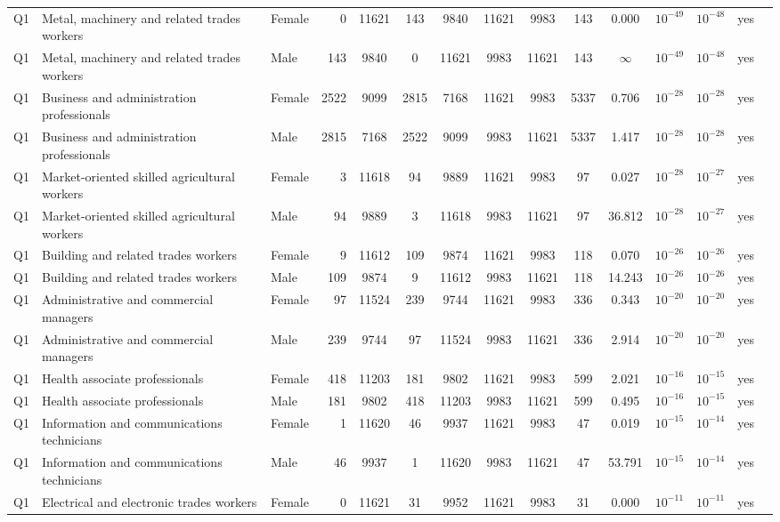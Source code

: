 \begin{longtable}{lllrcccccccccll}
Q1 & Metal, machinery and related trades workers & Female & 0 & 11621 & 143 & 9840 & 11621 & 9983 & 143 & 0.000 & $10^{-49}$ & $10^{-48}$ & yes \\
Q1 & Metal, machinery and related trades workers & Male & 143 & 9840 & 0 & 11621 & 9983 & 11621 & 143 & $\infty$ & $10^{-49}$ & $10^{-48}$ & yes \\
Q1 & Business and administration professionals & Female & 2522 & 9099 & 2815 & 7168 & 11621 & 9983 & 5337 & 0.706 & $10^{-28}$ & $10^{-28}$ & yes \\
Q1 & Business and administration professionals & Male & 2815 & 7168 & 2522 & 9099 & 9983 & 11621 & 5337 & 1.417 & $10^{-28}$ & $10^{-28}$ & yes \\
Q1 & Market-oriented skilled agricultural workers & Female & 3 & 11618 & 94 & 9889 & 11621 & 9983 & 97 & 0.027 & $10^{-28}$ & $10^{-27}$ & yes \\
Q1 & Market-oriented skilled agricultural workers & Male & 94 & 9889 & 3 & 11618 & 9983 & 11621 & 97 & 36.812 & $10^{-28}$ & $10^{-27}$ & yes \\
Q1 & Building and related trades workers & Female & 9 & 11612 & 109 & 9874 & 11621 & 9983 & 118 & 0.070 & $10^{-26}$ & $10^{-26}$ & yes \\
Q1 & Building and related trades workers & Male & 109 & 9874 & 9 & 11612 & 9983 & 11621 & 118 & 14.243 & $10^{-26}$ & $10^{-26}$ & yes \\
Q1 & Administrative and commercial managers & Female & 97 & 11524 & 239 & 9744 & 11621 & 9983 & 336 & 0.343 & $10^{-20}$ & $10^{-20}$ & yes \\
Q1 & Administrative and commercial managers & Male & 239 & 9744 & 97 & 11524 & 9983 & 11621 & 336 & 2.914 & $10^{-20}$ & $10^{-20}$ & yes \\
Q1 & Health associate professionals & Female & 418 & 11203 & 181 & 9802 & 11621 & 9983 & 599 & 2.021 & $10^{-16}$ & $10^{-15}$ & yes \\
Q1 & Health associate professionals & Male & 181 & 9802 & 418 & 11203 & 9983 & 11621 & 599 & 0.495 & $10^{-16}$ & $10^{-15}$ & yes \\
Q1 & Information and communications technicians & Female & 1 & 11620 & 46 & 9937 & 11621 & 9983 & 47 & 0.019 & $10^{-15}$ & $10^{-14}$ & yes \\
Q1 & Information and communications technicians & Male & 46 & 9937 & 1 & 11620 & 9983 & 11621 & 47 & 53.791 & $10^{-15}$ & $10^{-14}$ & yes \\
Q1 & Electrical and electronic trades workers & Female & 0 & 11621 & 31 & 9952 & 11621 & 9983 & 31 & 0.000 & $10^{-11}$ & $10^{-11}$ & yes \\

\end{longtable}

